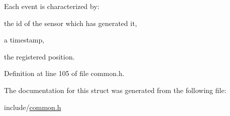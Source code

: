 Each event is characterized by\+:
\begin{DoxyItemize}
\item the id of the sensor which has generated it,
\item a timestamp,
\item the registered position. 
\end{DoxyItemize}

Definition at line 105 of file common.\+h.



The documentation for this struct was generated from the following file\+:\begin{DoxyCompactItemize}
\item 
include/\mbox{\hyperlink{common_8h}{common.\+h}}\end{DoxyCompactItemize}
